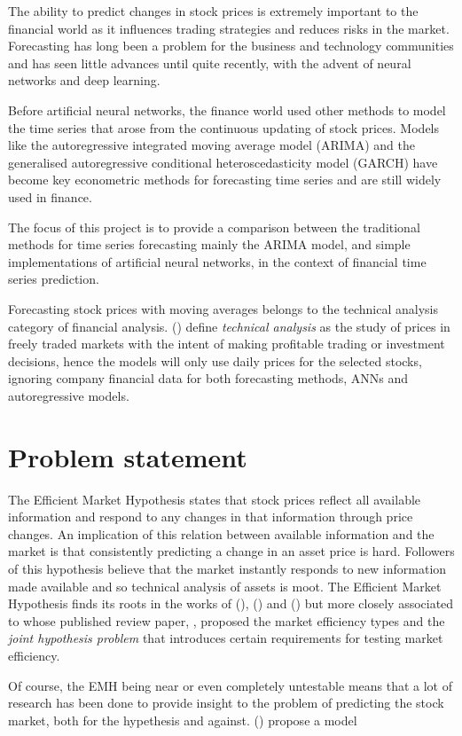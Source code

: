 The ability to predict changes in stock prices is extremely important to the financial world as it influences trading strategies and reduces risks in the market. Forecasting has long been a problem for the business and technology communities and has seen little advances until quite recently, with the advent of neural networks and deep learning.

Before artificial neural networks, the finance world used other methods to model the time series that arose from the continuous updating of stock prices. Models like the autoregressive integrated moving average model (ARIMA) and the generalised autoregressive conditional heteroscedasticity model (GARCH) have become key econometric methods for forecasting time series and are still widely used in finance.

The focus of this project is to provide a comparison between the traditional methods for time series forecasting mainly the ARIMA model, and simple implementations of artificial neural networks, in the context of financial time series prediction.

Forecasting stock prices with moving averages belongs to the technical analysis category of financial analysis. \citeauthor{tech_analysis} (\citeyear{tech_analysis}) define \textit{technical analysis} as the study of prices in freely traded markets with the intent of making profitable trading or investment decisions, hence the models will only use daily prices for the selected stocks, ignoring company financial data for both forecasting methods, ANNs and autoregressive models.

\section{Problem statement}
The Efficient Market Hypothesis states that stock prices reflect all available information and respond to any changes in that information through price changes. An implication of this relation between available information and the market is that consistently predicting a change in an asset price is hard. Followers of this hypothesis believe that the market instantly responds to new information made available and so technical analysis of assets is moot. The Efficient Market Hypothesis finds its roots in the works of \citeauthor{bachelier} (\citeyear{bachelier}), \citeauthor{mandelbrot} (\citeyear{mandelbrot}) and \citeauthor{samuelson} (\citeyear{samuelson}) but more closely associated to \citeauthor{fama_efficient_market} whose published review paper, \emph{}, proposed the market efficiency types and the \emph{joint hypothesis problem} that introduces certain requirements for testing market efficiency. 

Of course, the EMH being near or even completely untestable means that a lot of research has been done to provide insight to the problem of predicting the stock market, both for the hypethesis and against. \citeauthor{grossman-stiglitz} (\citeyear{grossman-stiglitz}) propose a model


